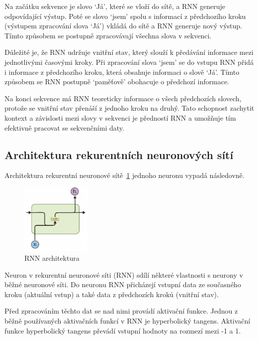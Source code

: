 Na začátku sekvence je slovo `Já', které se vloží do sítě, a RNN generuje odpovídající výstup.
Poté se slovo `jsem' spolu s informací z předchozího kroku (výstupem zpracování slova `Já') vkládá do sítě a RNN generuje nový výstup.
Tímto způsobem se postupně zpracovávají všechna slova v sekvenci.

Důležité je, že RNN udržuje vnitřní stav, který slouží k předávání informace mezi jednotlivými časovými kroky.
Při zpracování slova `jsem' se do vstupu RNN přidá i informace z předchozího kroku, která obsahuje informaci o slově `Já'.
Tímto způsobem se RNN postupně `paměťově' obohacuje o předchozí informace.

Na konci sekvence má RNN teoreticky informace o všech předchozích slovech, protože se vnitřní stav přenáší z jednoho kroku na druhý.
Tato schopnost zachytit kontext a závislosti mezi slovy v sekvenci je předností RNN a umožňuje tím efektivně pracovat se sekvenčními daty.

\subsection{Architektura rekurentních neuronových sítí}
Architektura rekurentní neuronové sítě~\ref{fig:RNN architektura} jednoho neuronu vypadá následovně.

\begin{figure}[H]
	\centering
	\includegraphics[width=0.3\textwidth]{Figures/RNN_basic_architecture.png}
	\caption{RNN architektura~\cite{link2}}\label{fig:RNN architektura}
\end{figure}

Neuron v rekurentní neuronové síti (RNN) sdílí některé vlastnosti s neurony v běžné neuronové síti.
Do neuronu RNN přicházejí vstupní data ze současného kroku (aktuální vstup) a také data z předchozích kroků (vnitřní stav).

Před zpracováním těchto dat se nad nimi provádí aktivační funkce.
Jednou z běžně používaných aktivačních funkcí v RNN je hyperbolický tangens.
Aktivační funkce hyperbolický tangens převádí vstupní hodnoty na rozmezí mezi -1 a 1.

